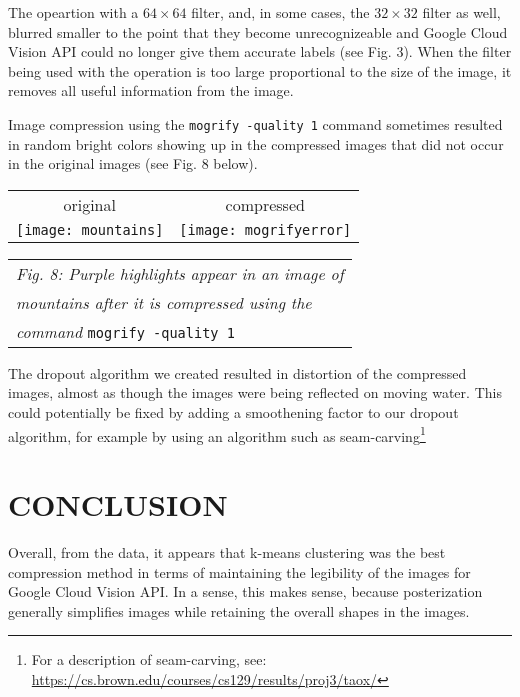 \documentclass[letterpaper, 10 pt, conference]{ieeeconf}  %
\begin{document}
The  opeartion with a $64 \times 64$ filter,
and, in some cases, the $32 \times 32$ filter as well,
blurred smaller to the point that they become unrecognizeable and
Google Cloud Vision API could no longer give them accurate labels (see
Fig. 3). When the filter being used with the 
operation is too large proportional to the size of the image, it
removes all useful information from the image.

Image compression using the {\tt mogrify -quality 1} command
sometimes resulted in random bright colors showing up in the compressed
images that did not occur in the original images (see Fig. 8 below).

\vspace*{3mm}
\begin{tabular}{c c}
	original & compressed \\
	\texttt{[image: mountains]} &
		\texttt{[image: mogrifyerror]} \\
\end{tabular}
\begin{tabular}{l}
	\hspace*{4mm} {\it Fig. 8: Purple highlights appear in an image of } \\
	\hspace*{4mm} {\it mountains after it is compressed using the } \\
	\hspace*{4mm} {\it command} {\tt mogrify -quality 1} \\
\end{tabular}
\vspace*{3mm}

The dropout algorithm we created resulted in distortion of
the compressed images, almost as though the images
were being reflected on moving water.
This could potentially be fixed by adding a smoothening
factor to our dropout algorithm, for example by
using an algorithm such as seam-carving\footnote{For a description
of seam-carving, see: \url{https://cs.brown.edu/courses/cs129/results/proj3/taox/}}

\section{CONCLUSION}

Overall, from the data, it appears that k-means clustering was
the best compression method in terms of maintaining the legibility
of the images for Google Cloud Vision API. In a sense, this makes
sense, because posterization generally simplifies images while
retaining the overall shapes in the images.
\end{document}
